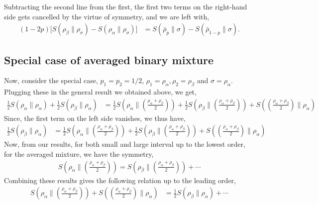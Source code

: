 \documentclass[11pt]{article}
\newcommand{\lb}{\left(}
\newcommand{\rb}{\right)}
\begin{document}
Subtracting the second line from the first, the first two terms on the right-hand side gets cancelled by the virtue of symmetry, and we are left with,
\begin{align}
    (1-2p) \Big[S (\rho_\beta\| \rho_\sigma)  - S (\rho_\alpha\| \rho_\sigma)\Big] &= S(\bar{\rho}_p \|\sigma) - S(\bar{\rho}_{1-p} \| \sigma).
\end{align}
\subsection{Special case of averaged binary mixture}
Now, consider the special case, $p_1 = p_2 =1/2$, $\rho_1 = \rho_\alpha, \rho_2 = \rho_\beta$ and $\sigma = \rho_\alpha$.
Plugging these in the general result we obtained above, we get,
\begin{align}
    \frac{1}{2}S(\rho_\alpha \| \rho_\alpha) + \frac{1}{2}S(\rho_\beta \| \rho_\alpha)  &= \frac{1}{2}S\lb \rho_\alpha \Big\| \lb\frac{\rho_\alpha + \rho_\beta}{2}\rb\rb + \frac{1}{2}S\lb \rho_\beta \Big\| \lb\frac{\rho_\alpha + \rho_\beta}{2}\rb\rb + S\lb \lb\frac{\rho_\alpha + \rho_\beta}{2}\rb \Big\| \rho_\alpha\rb
    \end{align}
Since, the first term on the left side vanishes, we thus have,
\begin{align}
    \frac{1}{2}S(\rho_\beta \| \rho_\alpha)  &=\frac{1}{2}S\lb \rho_\alpha \Big\| \lb\frac{\rho_\alpha + \rho_\beta}{2}\rb\rb + \frac{1}{2}S\lb \rho_\beta \Big\| \lb\frac{\rho_\alpha + \rho_\beta}{2}\rb\rb + S\lb \lb\frac{\rho_\alpha + \rho_\beta}{2}\rb \Big\| \rho_\alpha\rb
\end{align}
Now, from our results, for both small and large interval up to the lowest order, for the averaged mixture, we have the symmetry,
\begin{align}
    S\lb \rho_\alpha \Big\| \lb\frac{\rho_\alpha + \rho_\beta}{2}\rb\rb = S\lb \rho_\beta \Big\| \lb\frac{\rho_\alpha + \rho_\beta}{2}\rb\rb + \cdots
\end{align}
Combining these results gives the following relation up to the leading order,
\begin{align}
    S\lb \rho_\alpha \Big\| \lb\frac{\rho_\alpha + \rho_\beta}{2}\rb\rb + S\lb \lb\frac{\rho_\alpha + \rho_\beta}{2}\rb \Big\| \rho_\alpha\rb  &= \frac{1}{2} S(\rho_\beta \| \rho_\alpha)+\cdots
\end{align}
\end{document}
